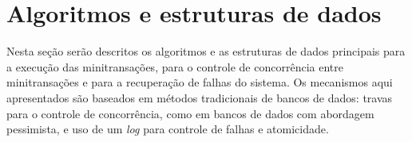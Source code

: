 \documentclass[11pt,twoside,a4paper]{book}
\begin{document}


\section{Algoritmos e estruturas de dados}
\label{sec:algoritmos}
Nesta seção serão descritos os algoritmos e as estruturas de dados principais para a execução das minitransações, para o controle de concorrência entre minitransações e para a recuperação de falhas do sistema. Os mecanismos aqui apresentados são baseados em métodos tradicionais de bancos de dados: travas para o controle de concorrência, como em bancos de dados com abordagem pessimista, e uso de um \emph{log} para controle de falhas e atomicidade.
\end{document}
